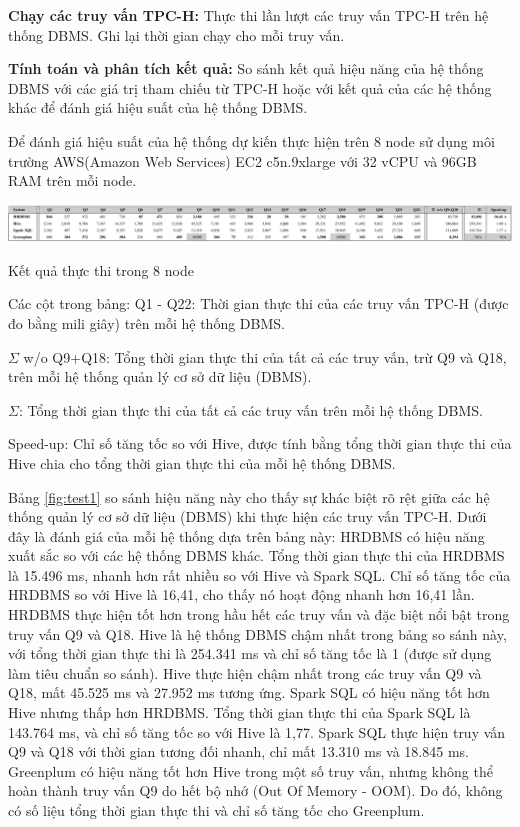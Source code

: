 \documentclass{article}[14pt]
\begin{document}
{\begin{itemize}
\end{itemize}


\textbf{Chạy các truy vấn TPC-H:} Thực thi lần lượt các truy vấn TPC-H trên hệ thống DBMS. Ghi lại thời gian chạy cho mỗi truy vấn.

\textbf{Tính toán và phân tích kết quả:} So sánh kết quả hiệu năng của hệ thống DBMS với các giá trị tham chiếu từ TPC-H hoặc với kết quả của các hệ thống khác để đánh giá hiệu suất của hệ thống DBMS.

Để đánh giá hiệu suất của hệ thống dự kiến thực hiện trên 8 node sử dụng môi trường AWS(Amazon Web Services) EC2 c5n.9xlarge với 32 vCPU và 96GB RAM trên mỗi node.


\begin{table}[htbp]
\centerline{\includegraphics[scale=0.43]{images/test1.png}}
\captionsetup{font=Large}
\caption{Kết quả thực thi trong 8 node \cite{arnold2019hrdbms}}
\label{fig:test1}
\end{table}


Các cột trong bảng:
Q1 - Q22: Thời gian thực thi của các truy vấn TPC-H (được đo bằng mili giây) trên mỗi hệ thống DBMS.

$\Sigma$ w/o Q9+Q18: Tổng thời gian thực thi của tất cả các truy vấn, trừ Q9 và Q18, trên mỗi hệ thống quản lý cơ sở dữ liệu (DBMS).

$\Sigma$: Tổng thời gian thực thi của tất cả các truy vấn trên mỗi hệ thống DBMS.

Speed-up: Chỉ số tăng tốc so với Hive, được tính bằng tổng thời gian thực thi của Hive chia cho tổng thời gian thực thi của mỗi hệ thống DBMS.

Bảng \ref{fig:test1} so sánh hiệu năng này cho thấy sự khác biệt rõ rệt giữa các hệ thống quản lý cơ sở dữ liệu (DBMS) khi thực hiện các truy vấn TPC-H. Dưới đây là đánh giá của mỗi hệ thống dựa trên bảng này:
HRDBMS có hiệu năng xuất sắc so với các hệ thống DBMS khác. Tổng thời gian thực thi của HRDBMS là 15.496 ms, nhanh hơn rất nhiều so với Hive và Spark SQL. Chỉ số tăng tốc của HRDBMS so với Hive là 16,41, cho thấy nó hoạt động nhanh hơn 16,41 lần. HRDBMS thực hiện tốt hơn trong hầu hết các truy vấn và đặc biệt nổi bật trong truy vấn Q9 và Q18.
Hive là hệ thống DBMS chậm nhất trong bảng so sánh này, với tổng thời gian thực thi là 254.341 ms và chỉ số tăng tốc là 1 (được sử dụng làm tiêu chuẩn so sánh). Hive thực hiện chậm nhất trong các truy vấn Q9 và Q18, mất 45.525 ms và 27.952 ms tương ứng.
Spark SQL có hiệu năng tốt hơn Hive nhưng thấp hơn HRDBMS. Tổng thời gian thực thi của Spark SQL là 143.764 ms, và chỉ số tăng tốc so với Hive là 1,77. Spark SQL thực hiện truy vấn Q9 và Q18 với thời gian tương đối nhanh, chỉ mất 13.310 ms và 18.845 ms.
Greenplum có hiệu năng tốt hơn Hive trong một số truy vấn, nhưng không thể hoàn thành truy vấn Q9 do hết bộ nhớ (Out Of Memory - OOM). Do đó, không có số liệu tổng thời gian thực thi và chỉ số tăng tốc cho Greenplum. 

}
\end{document}
